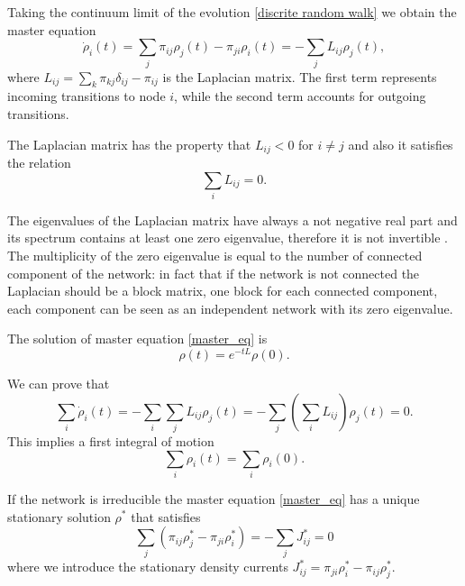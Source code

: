 Taking the continuum limit of the evolution \eqref{discrite random walk} we obtain the master equation \cite{Classic_random_walk}
\begin{equation}\label{master_eq}
    \dot \rho_i(t) = \sum_j \pi_{ij}\rho_j(t) - \pi_{ji}\rho_i(t) = - \sum_j L_{ij} \rho_j(t),
\end{equation}
where $L_{ij} = \sum_k \pi_{kj}\delta_{ij} -\pi_{ij} $ is the Laplacian matrix.
The first term represents incoming transitions to node $i$, while the second term accounts for outgoing transitions.

The Laplacian matrix has the property that $L_{ij} < 0 $ for $i \neq j$ and also it satisfies the relation
\begin{equation}
    \sum_i L_{ij} = 0 .
\end{equation} 

The eigenvalues of the Laplacian matrix have always a not negative real part and its spectrum contains at least one zero eigenvalue, therefore it is not invertible \cite{Boccaletti}. The multiplicity of the zero eigenvalue is equal to the number of connected component of the network: in fact that if the network is not connected the Laplacian should be a block matrix, one block for each connected component, each component can be seen as an independent network with its zero eigenvalue.

The solution of master equation \eqref{master_eq} is
\begin{equation}\label{random_walk_solution}
    \rho(t) = e^{-tL}\rho(0).
\end{equation}

We can prove that
\begin{equation}
    \sum_i \dot\rho_i(t) = - \sum_i \sum_j L_{ij} \rho_j(t) = - \sum_j \left(\sum_i L_{ij}\right) \rho_j(t) = 0 .
\end{equation}
This implies a first integral of motion 
\begin{equation}
    \sum_i \rho_i(t) = \sum_i \rho_i(0) .
\end{equation}


If the network is irreducible the master equation \eqref{master_eq} has a unique stationary solution $\rho^*$ that satisfies
\begin{equation}
    \sum_j (\pi_{ij}\rho_j^\ast-\pi_{ji}\rho_i^\ast)=-\sum_j J^*_{ij}=0
\end{equation}
where we introduce the stationary density currents $J^*_{ij} = \pi_{ji}\rho_i^\ast-\pi_{ij}\rho_j^\ast $.

